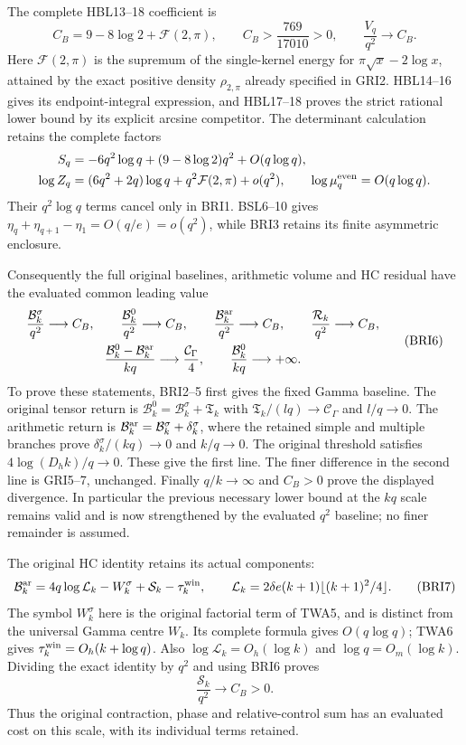 The complete HBL13--18 coefficient is
\[
 C_B=9-8\log2+\mathcal F(2,\pi),\qquad
 C_B>\frac{769}{17010}>0,\qquad
 \frac{V_q}{q^2}\longrightarrow C_B.
 \tag{BRI5}
\]
Here $\mathcal F(2,\pi)$ is the supremum of the single-kernel
energy for $\pi\sqrt x-2\log x$, attained by the exact positive
density $\rho_{2,\pi}$ already specified in GRI2. HBL14--16
gives its endpoint-integral expression, and HBL17--18 proves
the strict rational lower bound by its explicit arcsine competitor.
The determinant calculation retains the complete factors
\[
\begin{split}
 S_q&=-6q^2\log q+(9-8\log2)q^2+O(q\log q),\\
 \log Z_q&=(6q^2+2q)\log q+q^2\mathcal F(2,\pi)+o(q^2),\qquad
 \log\mu_q^{\rm even}=O(q\log q).
\end{split}
\]
Their $q^2\log q$ terms cancel only in BRI1. BSL6--10 gives
$\eta_q+\eta_{q+1}-\eta_1=O(q/e)=o(q^2)$, while BRI3
retains its finite asymmetric enclosure.

Consequently the full original baselines, arithmetic volume and
HC residual have the evaluated common leading value
\[
\begin{gathered}
 \frac{\mathcal B_k^\sigma}{q^2}\longrightarrow C_B,\qquad
 \frac{\mathcal B_k^0}{q^2}\longrightarrow C_B,\qquad
 \frac{\mathcal B_k^{\rm ar}}{q^2}\longrightarrow C_B,\qquad
 \frac{\mathcal R_k}{q^2}\longrightarrow C_B,\\
 \frac{\mathcal B_k^0-\mathcal B_k^{\rm ar}}{kq}
                \longrightarrow\frac{\mathcal C_\Gamma}{4},
 \qquad \frac{\mathcal B_k^0}{kq}\longrightarrow+\infty.
\end{gathered}\tag{BRI6}
\]
To prove these statements, BRI2--5 first gives the fixed Gamma
baseline. The original tensor return is
$\mathcal B_k^0=\mathcal B_k^\sigma+\mathfrak T_k$ with
$\mathfrak T_k/(lq)\to\mathcal C_\Gamma$ and $l/q\to0$.
The arithmetic return is
$\mathcal B_k^{\rm ar}=\mathcal B_k^\sigma+\delta_k^\sigma$,
where the retained simple and multiple branches prove
$\delta_k^\sigma/(kq)\to0$ and $k/q\to0$.
The original threshold satisfies $4\log(D_hk)/q\to0$.
These give the first line. The finer difference in the second line
is GRI5--7, unchanged. Finally $q/k\to\infty$ and $C_B>0$
prove the displayed divergence. In particular the previous necessary
lower bound at the $kq$ scale remains valid and is now strengthened
by the evaluated $q^2$ baseline; no finer remainder is assumed.

The original HC identity retains its actual components:
\[
 \mathcal B_k^{\rm ar}=4q\log\mathcal L_k-W_k^\sigma
                  +\mathcal S_k-\tau_k^{\rm win},\qquad
 \mathcal L_k=2\delta e(k+1)\lfloor(k+1)^2/4\rfloor.
 \tag{BRI7}
\]
The symbol $W_k^\sigma$ here is the original factorial term of
TWA5, and is distinct from the universal Gamma centre $W_k$.
Its complete formula gives $O(q\log q)$; TWA6 gives
$\tau_k^{\rm win}=O_h(k+\log q)$. Also
$\log\mathcal L_k=O_h(\log k)$ and $\log q=O_m(\log k)$.
Dividing the exact identity by $q^2$ and using BRI6 proves
\[
 \frac{\mathcal S_k}{q^2}\longrightarrow C_B>0.
 \tag{BRI8}
\]
Thus the original contraction, phase and relative-control sum has
an evaluated cost on this scale, with its individual terms retained.

